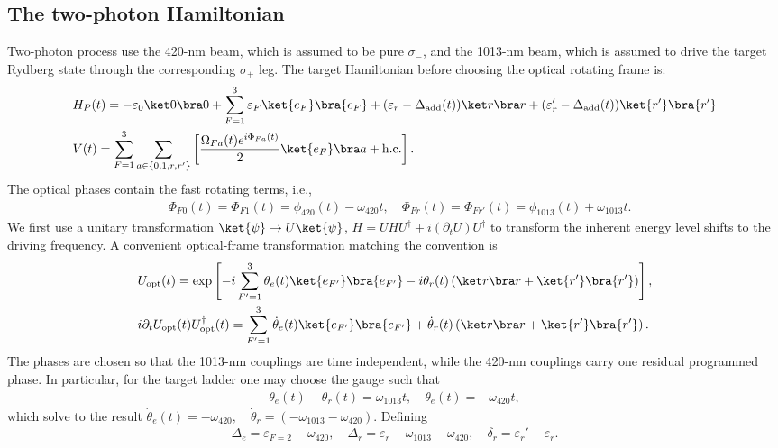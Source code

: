 \subsection{The two-photon Hamiltonian}
Two-photon process use the 420-nm beam, which is assumed to be pure $\sigma_-$, and the 1013-nm beam, which is assumed to drive the target Rydberg state through the corresponding $\sigma_+$ leg.
The target Hamiltonian before choosing the optical rotating frame is:
\begin{align}
&H_P(t)
=-\varepsilon_0\ket0\bra0  + \sum_{F=1}^3 \varepsilon_F\ket{e_{F}}\bra{e_{F}} + (\varepsilon_r-\Delta_{\mathrm{add}}(t))\ket r\bra r + (\varepsilon'_r-\Delta_{\mathrm{add}}(t))\ket{r'}\bra{r'} \\
& V(t) =
\sum_{F=1}^3 \sum_{a \in \{0,1,r,r'\}}
\left[
\frac{\Omega_{Fa}(t)e^{i\Phi_{Fa}(t)}}{2}\ket{e_{F}}\bra a
+\mathrm{h.c.}\right].
\end{align}
The optical phases contain the fast rotating terms, i.e.,
\begin{align}
&\Phi_{F0}(t)=\Phi_{F1}(t) = \phi_{\mathrm{420}}(t) - \omega_{\mathrm{420}} t, \quad \Phi_{Fr}(t) = \Phi_{Fr'}(t) =\phi_{\mathrm{1013}}(t) + \omega_{\mathrm{1013}}t.
\end{align}
We first use a unitary transformation $\ket{\psi} \to U\ket{\psi}$, $H = U H U^\dagger + i (\partial_t U) U^\dagger$ to transform the inherent energy level shifts to the driving frequency. A convenient optical-frame transformation matching the convention is
\begin{align}
&U_{\rm opt}(t) =
\exp\left[
-i\sum_{F'=1}^3\theta_{e}(t)\ket{e_{F'}}\bra{e_{F'}}
-i\theta_r(t)\left(\ket r\bra r + \ket{r'}\bra{r'}\right)\right],\\
&i\partial_t U_{\rm opt}(t)U^\dagger_{\rm opt}(t) = \sum_{F'=1}^3\dot\theta_{e}(t)\ket{e_{F'}}\bra{e_{F'}} + \dot\theta_r(t)\left(\ket r\bra r + \ket{r'}\bra{r'}\right).
\end{align}
The phases are chosen so that the 1013-nm couplings are time independent,
while the 420-nm couplings carry one residual programmed phase. In particular,
for the target ladder one may choose the gauge such that
\begin{align}
\theta_{e}(t)-\theta_r(t)= \omega_{\mathrm{1013}}t,
\quad
\theta_{e}(t) =  -\omega_{\mathrm{420}} t,
\end{align}
which solve to the result $\dot\theta_{e}(t) = -\omega_{\mathrm{420}}, \quad \dot\theta_r = (-\omega_{\mathrm{1013}} -\omega_{\mathrm{420}})$.
Defining
\begin{align}
\Delta_e = \varepsilon_{F = 2}  - \omega_{\mathrm{420}}, \quad
\Delta_r = \varepsilon_r - \omega_{\mathrm{1013}} - \omega_{\mathrm{420}}, \quad 
\delta_r = \varepsilon_r' -  \varepsilon_r.
\end{align}
